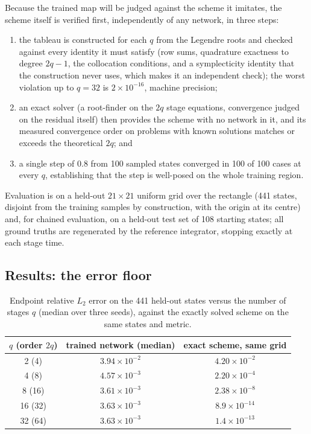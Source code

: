\documentclass[11pt,a4paper]{article}
\begin{document}
Because the trained map will be judged against the scheme it imitates, the
scheme itself is verified first, independently of any network, in three
steps:
\begin{enumerate}
  \item the tableau is constructed for each $q$ from the Legendre roots
  and checked against every identity it must satisfy (row sums,
  quadrature exactness to degree $2q-1$, the collocation conditions, and
  a symplecticity identity that the construction never uses, which makes
  it an independent check); the worst violation up to $q = 32$ is
  $2\times10^{-16}$, machine precision;
  \item an exact solver (a root-finder on the $2q$ stage equations,
  convergence judged on the residual itself) then provides the scheme
  with no network in it, and its measured convergence order on problems
  with known solutions matches or exceeds the theoretical $2q$; and
  \item a single step of $0.8$ from 100 sampled states converged in 100
  of 100 cases at every $q$, establishing that the step is well-posed on
  the whole training region.
\end{enumerate}
Evaluation is on a held-out $21\times21$ uniform grid over
the rectangle (441 states, disjoint from the training samples by
construction, with the origin at its centre) and, for chained evaluation,
on a held-out test set of 108 starting states; all ground truths are
regenerated by the reference integrator, stopping exactly at each stage
time.

\subsection{Results: the error floor}
\label{sec:disc-results}

\begin{table}[tbp]
  \centering
  \caption{Endpoint relative $L_2$ error on the 441 held-out states versus
  the number of stages $q$ (median over three seeds), against the exactly
  solved scheme on the same states and metric.}
  \label{tab:floor}
  \small
  \begin{tabular}{ccc}
    \toprule
    $q$ (order $2q$) & trained network (median) & exact scheme, same grid \\
    \midrule
    2 (4)   & $3.94\times10^{-2}$ & $4.20\times10^{-2}$ \\
    4 (8)   & $4.57\times10^{-3}$ & $2.20\times10^{-4}$ \\
    8 (16)  & $3.61\times10^{-3}$ & $2.38\times10^{-8}$ \\
    16 (32) & $3.63\times10^{-3}$ & $8.9\times10^{-14}$ \\
    32 (64) & $3.63\times10^{-3}$ & $1.4\times10^{-13}$ \\
    \bottomrule
  \end{tabular}
\end{table}
\end{document}
